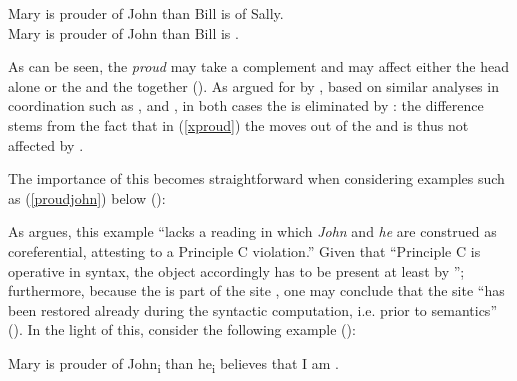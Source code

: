 \ea \label{disjoint3}
\ea	Mary is prouder of John than Bill is \underline{\hspace{1cm}} of Sally.\\ \label{xproud}
\ex	Mary is prouder of John than Bill is \underline{\hspace{1cm}} .\\
\z
\z

As can be seen, the  \textit{proud} may take a  complement and  may affect either the  head alone or the  and the  together (\citealt[14]{lechner2004}). As argued for by \citet[15--16]{lechner2004}, based on similar analyses in coordination such as \citet{jayaseelan1990}, \citet{johnson1997} and \citet{lasnik1995}, in both cases the  is eliminated by : the difference stems from the fact that in (\ref{xproud}) the  moves out of the  and is thus not affected by .

The importance of this becomes straightforward when considering examples such as (\ref{proudjohn}) below (\citealt[16, ex. 24]{lechner2004}):

 \label{proudjohn}
\z

As \citet[16]{lechner2004} argues, this example ``lacks a reading in which \textit{John} and \textit{he} are construed as coreferential, attesting to a Principle C violation.'' Given that ``Principle C is operative in syntax, the object  accordingly has to be present at least by ''; furthermore, because the  is part of the site , one may conclude that the site ``has been restored already during the syntactic computation, i.e. prior to semantics'' (\citealt[16]{lechner2004}). In the light of this, consider the following example (\citealt[16, ex. 25]{lechner2004}):

\ea	Mary is prouder of John\textsubscript{i} than he\textsubscript{i} believes that I am \underline{\hspace{1cm}} .\\ \label{proudof}
\z

